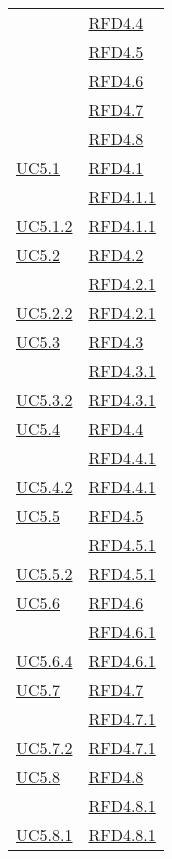 \begin{longtable}{|>{\centering}m{5cm}|m{5cm}<{\centering}|}
& \hyperlink{RFD4.4}{RFD4.4}\\
& \hyperlink{RFD4.5}{RFD4.5}\\
& \hyperlink{RFD4.6}{RFD4.6}\\
& \hyperlink{RFD4.7}{RFD4.7}\\
& \hyperlink{RFD4.8}{RFD4.8}\\ \hline
\hyperref[UC5.1]{UC5.1} & \hyperlink{RFD4.1}{RFD4.1}\\
& \hyperlink{RFD4.1.1}{RFD4.1.1}\\ \hline
\hyperref[UC5.1.2]{UC5.1.2} & \hyperlink{RFD4.1.1}{RFD4.1.1}\\ \hline
\hyperref[UC5.2]{UC5.2} & \hyperlink{RFD4.2}{RFD4.2}\\
& \hyperlink{RFD4.2.1}{RFD4.2.1}\\ \hline
\hyperref[UC5.2.2]{UC5.2.2} & \hyperlink{RFD4.2.1}{RFD4.2.1}\\ \hline
\hyperref[UC5.3]{UC5.3} & \hyperlink{RFD4.3}{RFD4.3}\\
& \hyperlink{RFD4.3.1}{RFD4.3.1}\\ \hline
\hyperref[UC5.3.2]{UC5.3.2} & \hyperlink{RFD4.3.1}{RFD4.3.1}\\ \hline
\hyperref[UC5.4]{UC5.4} & \hyperlink{RFD4.4}{RFD4.4}\\
& \hyperlink{RFD4.4.1}{RFD4.4.1}\\ \hline
\hyperref[UC5.4.2]{UC5.4.2} & \hyperlink{RFD4.4.1}{RFD4.4.1}\\ \hline
\hyperref[UC5.5]{UC5.5} & \hyperlink{RFD4.5}{RFD4.5}\\
& \hyperlink{RFD4.5.1}{RFD4.5.1}\\ \hline
\hyperref[UC5.5.2]{UC5.5.2} & \hyperlink{RFD4.5.1}{RFD4.5.1}\\ \hline
\hyperref[UC5.6]{UC5.6} & \hyperlink{RFD4.6}{RFD4.6}\\
& \hyperlink{RFD4.6.1}{RFD4.6.1}\\ \hline
\hyperref[UC5.6.4]{UC5.6.4} & \hyperlink{RFD4.6.1}{RFD4.6.1}\\ \hline
\hyperref[UC5.7]{UC5.7} & \hyperlink{RFD4.7}{RFD4.7}\\
& \hyperlink{RFD4.7.1}{RFD4.7.1}\\ \hline
\hyperref[UC5.7.2]{UC5.7.2} & \hyperlink{RFD4.7.1}{RFD4.7.1}\\ \hline
\hyperref[UC5.8]{UC5.8} & \hyperlink{RFD4.8}{RFD4.8}\\
& \hyperlink{RFD4.8.1}{RFD4.8.1}\\ \hline
\hyperref[UC5.8.1]{UC5.8.1} & \hyperlink{RFD4.8.1}{RFD4.8.1}\\ \hline

\end{longtable}
